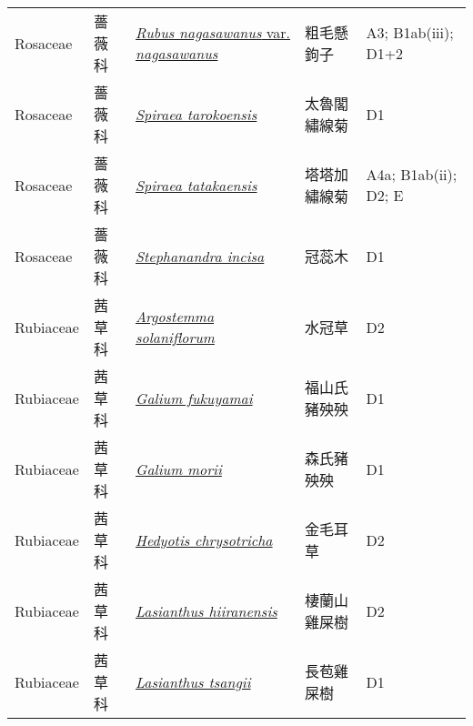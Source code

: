 {\begin{longtable}{p{2.5cm}p{2.5cm}p{4.5cm}p{2.5cm}p{3cm}}
    Rosaceae & 薔薇科 & \href{http://www.theplantlist.org/tpl1.1/search?q=Rubus+nagasawanus+var.+nagasawanus}{\textit{Rubus nagasawanus} var. \textit{nagasawanus} } & 粗毛懸鉤子 & A3; B1ab(iii); D1+2 \index{Rubus@\textit{Rubus}!nagasawanus@\textit{nagasawanus}!var. nagasawanus@var. \textit{nagasawanus}}  \index{粗毛懸鉤子} \\
    Rosaceae & 薔薇科 & \href{http://www.theplantlist.org/tpl1.1/search?q=Spiraea+tarokoensis}{\textit{Spiraea tarokoensis} } & 太魯閣繡線菊 & D1 \index{Spiraea@\textit{Spiraea}!tarokoensis@\textit{tarokoensis}}  \index{太魯閣繡線菊} \\
    Rosaceae & 薔薇科 & \href{http://www.theplantlist.org/tpl1.1/search?q=Spiraea+tatakaensis}{\textit{Spiraea tatakaensis} } & 塔塔加繡線菊 & A4a; B1ab(ii); D2; E \index{Spiraea@\textit{Spiraea}!tatakaensis@\textit{tatakaensis}}  \index{塔塔加繡線菊} \\
    Rosaceae & 薔薇科 & \href{http://www.theplantlist.org/tpl1.1/search?q=Stephanandra+incisa}{\textit{Stephanandra incisa} } & 冠蕊木 & D1 \index{Stephanandra@\textit{Stephanandra}!incisa@\textit{incisa}}  \index{冠蕊木} \\
    Rubiaceae & 茜草科 & \href{http://www.theplantlist.org/tpl1.1/search?q=Argostemma+solaniflorum}{\textit{Argostemma solaniflorum} } & 水冠草 & D2 \index{Argostemma@\textit{Argostemma}!solaniflorum@\textit{solaniflorum}}  \index{水冠草} \\
    Rubiaceae & 茜草科 & \href{http://www.theplantlist.org/tpl1.1/search?q=Galium+fukuyamai}{\textit{Galium fukuyamai} } & 福山氏豬殃殃 & D1 \index{Galium@\textit{Galium}!fukuyamai@\textit{fukuyamai}}  \index{福山氏豬殃殃} \\
    Rubiaceae & 茜草科 & \href{http://www.theplantlist.org/tpl1.1/search?q=Galium+morii}{\textit{Galium morii} } & 森氏豬殃殃 & D1 \index{Galium@\textit{Galium}!morii@\textit{morii}}  \index{森氏豬殃殃} \\
    Rubiaceae & 茜草科 & \href{http://www.theplantlist.org/tpl1.1/search?q=Hedyotis+chrysotricha}{\textit{Hedyotis chrysotricha} } & 金毛耳草 & D2 \index{Hedyotis@\textit{Hedyotis}!chrysotricha@\textit{chrysotricha}}  \index{金毛耳草} \\
    Rubiaceae & 茜草科 & \href{http://www.theplantlist.org/tpl1.1/search?q=Lasianthus+hiiranensis}{\textit{Lasianthus hiiranensis} } & 棲蘭山雞屎樹 & D2 \index{Lasianthus@\textit{Lasianthus}!hiiranensis@\textit{hiiranensis}}  \index{棲蘭山雞屎樹} \\
    Rubiaceae & 茜草科 & \href{http://www.theplantlist.org/tpl1.1/search?q=Lasianthus+tsangii}{\textit{Lasianthus tsangii} } & 長苞雞屎樹 & D1 \index{Lasianthus@\textit{Lasianthus}!tsangii@\textit{tsangii}}  \index{長苞雞屎樹} \\

\end{longtable}}
